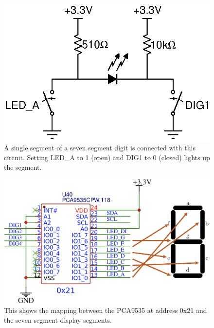 \begin{figure}[!htb]
	\centering
	\includegraphics{i2cgpio/7SegCircuit.eps}
    \caption{A single segment of a seven segment digit is connected with this circuit. 
        Setting LED\_A to 1 (open) and DIG1 to 0 (closed) lights up the segment.}
    \label{fig:sevensegindcircuit}
\end{figure}

\begin{figure}[!htb]
	\centering
	\includegraphics[scale=0.23]{i2cgpio/PCA9535-Segs.png}
    \caption{This shows the mapping between the PCA9535 at address 0x21 and 
    the seven segment display segments.}
    \label{fig:PCA9535Segs}
\end{figure}

